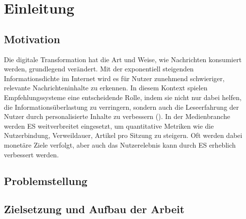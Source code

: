 \section{Einleitung}

\subsection{Motivation}
Die digitale Transformation hat die Art und Weise, wie Nachrichten konsumiert werden, grundlegend verändert. 
Mit der exponentiell steigenden Informationsdichte im Internet wird es für Nutzer zunehmend schwieriger, 
relevante Nachrichteninhalte zu erkennen.
In diesem Kontext spielen Empfehlungssysteme eine entscheidende Rolle, indem sie nicht nur dabei helfen, 
die Informationsüberlastung zu verringern, sondern auch die Leseerfahrung der Nutzer durch personalisierte Inhalte
zu verbessern (\cite{wu_personalized_2022}). \newline
In der Medienbranche werden \ac{ES} weitverbreitet eingesetzt, um quantitative Metriken wie die Nutzerbindung, Verweildauer, Artikel pro Sitzung zu steigern. Oft werden dabei monetäre Ziele verfolgt, aber auch das Nutzerelebnis kann durch \ac{ES} erheblich verbessert werden.


\subsection{Problemstellung}

\subsection{Zielsetzung und Aufbau der Arbeit}

